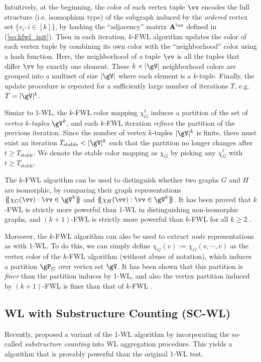 \documentclass{article} %
\newcommand*{\ldblbrace}{\{\mskip-5mu\{}
\newcommand*{\rdblbrace}{\}\mskip-5mu\}}
\begin{document}
Intuitively, at the beginning, the color of each vertex tuple $\vv$ encodes the full structure (i.e. isomophism type) of the subgraph induced by the \emph{ordered} vertex set $\{v_i:i\in[k]\}$, by hashing the ``adjacency'' matrix $\mathbf A^\vv$ defined in (\ref{eq:kfwl_init}). Then in each iteration, $k$-FWL algorithm updates the color of each vertex tuple by combining its own color with the ``neighborhood'' color using a hash function. Here, the neighborhood of a tuple $\vv$ is all the tuples that differ $\vv$ by exactly one element. These $k\times |\gV|$ neighborhood colors are grouped into a multiset of size $|\gV|$ where each element is a $k$-tuple. Finally, the update procedure is repeated for a sufficiently large number of iterations $T$, e.g. $T=|\gV|^k$.

Simiar to 1-WL, the $k$-FWL color mapping $\chi_G^t$ induces a partition of the set of \emph{vertex $k$-tuples} $\gV^k$, and each $k$-FWL iteration \emph{refines} the partition of the previous iteration. Since the number of vertex $k$-tuples $|\gV|^k$ is finite, there must exist an iteration $T_{\text{stable}}<|\gV|^k$ such that the partition no longer changes after $t\ge T_{\text{stable}}$. We denote the stable color mapping as $\chi_G$ by picking any $\chi_G^t$ with $t\ge T_{\text{stable}}$.

The $k$-FWL algorithm can be used to distinguish whether two graphs $G$ and $H$ are isomorphic, by comparing their graph representations $\ldblbrace \chi_G(\vv):\vv\in\gV^k\rdblbrace$ and $\ldblbrace \chi_H(\vv):\vv\in\gV^k\rdblbrace$. It has been proved that $k$-FWL is strictly more powerful than 1-WL in distinguishing non-isomorphic graphs, and $(k+1)$-FWL is strictly more powerful than $k$-FWL for all $k\ge 2$ \citep{cai1992optimal}.

Moreover, the $k$-FWL algorithm can also be used to extract \emph{node} representations as with 1-WL. To do this, we can simply define $\chi_G(v):=\chi_G(v,\cdots,v)$ as the vertex color of the $k$-FWL algorithm (without abuse of notation), which induces a partition $\gP_G$ over vertex set $\gV$. It has been shown that this partition is \emph{finer} than the partition induces by 1-WL, and also the vertex partition induced by $(k+1)$-FWL is finer than that of $k$-FWL \citep{kiefer2020power}.

\subsection{WL with Substructure Counting (SC-WL)}
\label{sec:scwl}
Recently, \citet{bouritsas2022improving} proposed a variant of the 1-WL algorithm by incorporating the so-called \emph{substructure counting} into WL aggregation procedure. This yields a algorithm that is provably powerful than the original 1-WL test.
\end{document}
